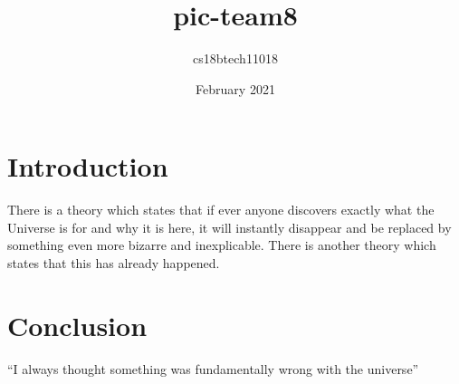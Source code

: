 \documentclass{article}
\title{pic-team8}
\author{cs18btech11018 }
\date{February 2021}
\begin{document}
\maketitle
\frac{}{} 
\section{Introduction}
There is a theory which states that if ever anyone discovers exactly what the Universe is for and why it is here, it will instantly disappear and be replaced by something even more bizarre and inexplicable.
There is another theory which states that this has already happened.


\section{Conclusion}
``I always thought something was fundamentally wrong with the universe'' \citep{adams1995hitchhiker}



\end{document}
